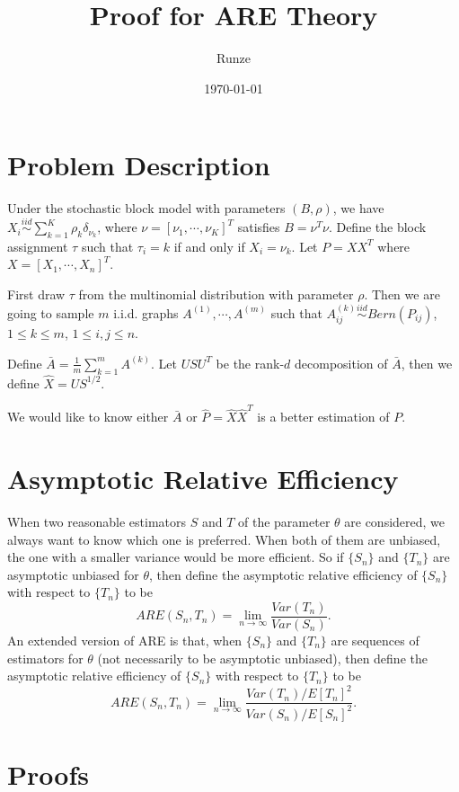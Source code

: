 \documentclass[a4paper]{article}
\title{Proof for ARE Theory}
\author{Runze}
\date{\today}
\begin{document}
\maketitle

\section{Problem Description}

Under the stochastic block model with parameters $(B, \rho)$, we have $X_i \stackrel{iid}{\sim} \sum_{k=1}^K \rho_k \delta_{\nu_k}$, where $\nu = [\nu_1, \cdots, \nu_K]^T$ satisfies $B = \nu^T \nu$. Define the block assignment $\tau$ such that $\tau_i = k$ if and only if $X_i = \nu_k$. Let $P = X X^T$ where $X = [X_1, \cdots, X_n]^T$.

First draw $\tau$ from the multinomial distribution with parameter $\rho$. Then we are going to sample $m$ i.i.d. graphs $A^{(1)}, \cdots, A^{(m)}$ such that $A^{(k)}_{ij} \stackrel{iid}{\sim} Bern(P_{ij})$, $1 \le k \le m$, $1 \le i, j \le n$.

Define $\bar{A} = \frac{1}{m} \sum_{k=1}^m A^{(k)}$. Let $U S U^T$ be the rank-$d$ decomposition of $\bar{A}$, then we define $\hat{X} = U S^{1/2}$.

We would like to know either $\bar{A}$ or $\hat{P} = \hat{X} \hat{X}^T$ is a better estimation of $P$.


\section{Asymptotic Relative Efficiency}

When two reasonable estimators $S$ and $T$ of the parameter $\theta$ are considered, we always want to know which one is preferred. When both of them are unbiased, the one with a smaller variance would be more efficient. So if $\{S_n\}$ and $\{T_n\}$ are asymptotic unbiased for $\theta$, then define the asymptotic relative efficiency of $\{S_n\}$ with respect to $\{T_n\}$ to be
\[
	ARE(S_n, T_n) = \lim_{n \rightarrow \infty} \frac{Var(T_n)}{Var(S_n)}.
\]
An extended version of ARE is that, when $\{S_n\}$ and $\{T_n\}$ are sequences of estimators for $\theta$ (not necessarily to be asymptotic unbiased), then define the asymptotic relative efficiency of $\{S_n\}$ with respect to $\{T_n\}$ to be
\[
	ARE(S_n, T_n) = \lim_{n \rightarrow \infty} \frac{Var(T_n)/E[T_n]^2}{Var(S_n)/E[S_n]^2}.
\]



\section{Proofs}
\end{document}
